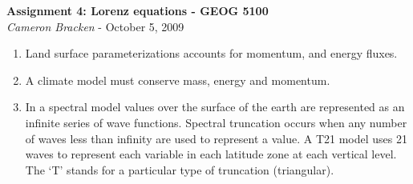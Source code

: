 \documentclass[11pt,oneside]{article}
\begin{document}
\begin{center}
	\textbf{Assignment 4: Lorenz equations - GEOG 5100}\\
	{\itshape Cameron Bracken} - October 5, 2009
\end{center}


\begin{enumerate}

\item Land surface parameterizations accounts for momentum, and energy fluxes. 

\item A climate model must conserve mass, energy and momentum. 

\item In a spectral model values over the surface of the earth are represented as an infinite series of wave functions. Spectral truncation occurs when any number of waves less than infinity are used to represent a value.  A T21 model uses 21 waves to represent each variable in each latitude zone at each vertical level.   The `T' stands for a particular type of truncation (triangular).


\end{enumerate}
\end{document}
